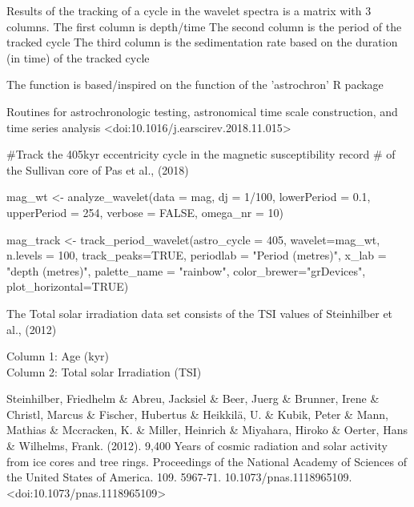\documentclass[a4paper]{book}
\begin{document}
%
\begin{Value}
Results of the tracking of a cycle in the wavelet spectra is a matrix with 3 columns.
The first column is depth/time
The second column is the period of the tracked cycle
The third column is the sedimentation rate based on the duration (in time) of the tracked cycle
\end{Value}
%
\begin{Author}
The function is based/inspired on the 
function of the 'astrochron' R package
\end{Author}
%
\begin{References}
Routines for astrochronologic testing, astronomical time scale construction, and
time series analysis <doi:10.1016/j.earscirev.2018.11.015>
\end{References}
%
\begin{Examples}
\begin{ExampleCode}

#Track the 405kyr eccentricity cycle in the magnetic susceptibility record
# of the Sullivan core of Pas et al., (2018)

mag_wt <- analyze_wavelet(data = mag,
dj = 1/100,
lowerPeriod = 0.1,
upperPeriod = 254,
verbose = FALSE,
omega_nr = 10)

mag_track <- track_period_wavelet(astro_cycle = 405,
                                  wavelet=mag_wt,
                                  n.levels = 100,
                                  track_peaks=TRUE,
                                  periodlab = "Period (metres)",
                                  x_lab = "depth (metres)",
                                 palette_name = "rainbow",
                                 color_brewer="grDevices",
                                 plot_horizontal=TRUE)


\end{ExampleCode}
\end{Examples}
%
\begin{Description}
The Total solar irradiation data set consists of the TSI values of Steinhilber et al., (2012)
\end{Description}
%
\begin{Details}
Column 1: Age (kyr)\\{}
Column 2: Total solar Irradiation (TSI)\\{}
\end{Details}
%
\begin{References}
Steinhilber, Friedhelm \& Abreu, Jacksiel \& Beer, Juerg \& Brunner,
Irene \& Christl, Marcus \& Fischer, Hubertus \& Heikkilä, U. \& Kubik,
Peter \& Mann, Mathias \& Mccracken, K. \& Miller, Heinrich \& Miyahara,
Hiroko \& Oerter, Hans \& Wilhelms, Frank. (2012).
9,400 Years of cosmic radiation and solar activity from ice cores and tree rings.
Proceedings of the National Academy of Sciences of the United States of America.
109. 5967-71. 10.1073/pnas.1118965109.
<doi:10.1073/pnas.1118965109>
\end{References}
\end{document}
